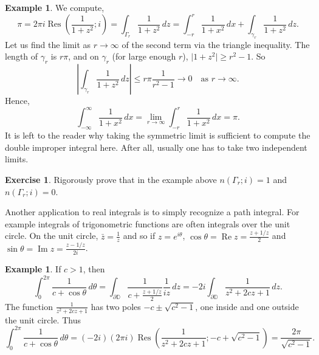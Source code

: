 \documentclass[12pt,openany]{book}
\renewcommand{\Re}{\operatorname{Re}}
\renewcommand{\Im}{\operatorname{Im}}
\newcommand{\sabs}[1]{\lvert {#1} \rvert}
\newcommand{\abs}[1]{\left\lvert {#1} \right\rvert}
\newcommand{\D}{{\mathbb{D}}}
\theoremstyle{plain}
\theoremstyle{remark}
\theoremstyle{definition}
\newenvironment{exbox}{%
    \def\FrameCommand{\vrule width 1pt \relax\hspace{10pt}}%
    \MakeFramed{\advance\hsize-\width\FrameRestore}%
}{%
    \endMakeFramed
}
\theoremstyle{exercise}
\newtheorem{exercise}{Exercise}[section]
\theoremstyle{example}
\newtheorem{example}[thm]{Example}
\begin{document}
\begin{example}
We compute,
\begin{equation*}
\pi 
=
2 \pi i \operatorname{Res}\left(\frac{1}{1+z^2};i\right) =
\int_{\Gamma_r} \frac{1}{1+z^2} \, dz
=
\int_{-r}^r \frac{1}{1+x^2} \, dx
+
\int_{\gamma_r} \frac{1}{1+z^2} \, dz .
\end{equation*}
Let us find the limit as $r \to \infty$ of the second term
via the triangle inequality.  The length of $\gamma_r$ is $r\pi$,
and on $\gamma_r$ (for large enough $r$),
$\sabs{1+z^2} \geq r^2-1$.  So
\begin{equation*}
\abs{
\int_{\gamma_r} \frac{1}{1+z^2} \, dz 
}
\leq
r \pi \frac{1}{r^2-1} \to 0 \quad \text{as } r \to \infty .
\end{equation*}
Hence,
\begin{equation*}
\int_{-\infty}^\infty
\frac{1}{1+x^2} \, dx
=
\lim_{r\to \infty} \int_{-r}^r 
\frac{1}{1+x^2} \, dx
= \pi .
\end{equation*}
It is left to the reader why taking the symmetric limit is sufficient to
compute the double improper integral here.  After all, usually one has to
take two independent limits.
\end{example}

\begin{exbox}
\begin{exercise}
Rigorously prove that in the example above
$n(\Gamma_r;i) = 1$ and
$n(\Gamma_r;i) = 0$.
\end{exercise}
\end{exbox}

Another application to real integrals is to simply recognize 
a path integral.  For example integrals of trigonometric functions
are often integrals over the unit circle.  On the unit
circle, $\bar{z} = \frac{1}{z}$ and so if $z=e^{i\theta}$,
$\cos \theta = \Re z = \frac{z+1/z}{2}$ and
$\sin \theta = \Im z = \frac{z-1/z}{2i}$.

\begin{example}
If $c > 1$, then
\begin{equation*}
\int_0^{2\pi} \frac{1}{c+\cos \theta} \, d\theta 
=
\int_{\partial \D} \frac{1}{c+\frac{z+1/z}{2}} \frac{1}{iz} \, dz
=
-2i
\int_{\partial \D} \frac{1}{z^2 + 2cz + 1} \, dz
.
\end{equation*}
The function $\frac{1}{z^2 + 2cz + 1}$ has two poles $-c \pm \sqrt{c^2-1}$,
one inside and one outside the unit circle.  Thus
\begin{equation*}
\int_0^{2\pi} \frac{1}{c+\cos \theta} \, d\theta 
=
(-2i)
(2 \pi i)
\operatorname{Res}
\left(\frac{1}{z^2 + 2cz + 1}; -c+\sqrt{c^2-1}\right)
=
\frac{2\pi}{\sqrt{c^2-1}}
.
\end{equation*}

\end{example}
\end{document}
